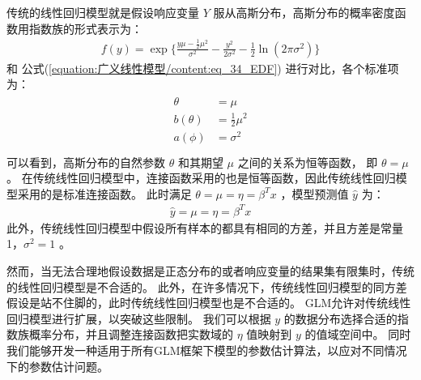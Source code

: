 \documentclass[letterpaper,10pt,english]{sphinxmanual}
\begin{document}
传统的线性回归模型就是假设响应变量 \(Y\) 服从高斯分布，高斯分布的概率密度函数用指数族的形式表示为：
\begin{equation}\label{equation:广义线性模型/content:广义线性模型/content:17}
\begin{split}f(y) = \exp \{ \frac{y\mu-\frac{1}{2}\mu^2}{\sigma^2} - \frac{y^2}{2\sigma^2}
- \frac{1}{2} \ln (2\pi\sigma^2) \}\end{split}
\end{equation}
和 公式(\ref{equation:广义线性模型/content:eq_34_EDF}) 进行对比，各个标准项为：
\begin{align}\label{equation:广义线性模型/content:广义线性模型/content:18}\!\begin{aligned}
\theta &=\mu\\
b(\theta) &= \frac{1}{2}\mu^2\\
a(\phi) &= \sigma^2\\
\end{aligned}\end{align}
可以看到，高斯分布的自然参数 \(\theta\) 和其期望 \(\mu\) 之间的关系为恒等函数，
即 \(\theta=\mu\) 。
在传统线性回归模型中，连接函数采用的也是恒等函数，因此传统线性回归模型采用的是标准连接函数。
此时满足 \(\theta=\mu=\eta=\beta^Tx\)
，模型预测值 \(\hat{y}\) 为：
\begin{equation}\label{equation:广义线性模型/content:广义线性模型/content:19}
\begin{split}\hat{y} = \mu = \eta =\beta^Tx\end{split}
\end{equation}
此外，传统线性回归模型中假设所有样本的都具有相同的方差，并且方差是常量1，\(\sigma^2=1\)
。

然而，当无法合理地假设数据是正态分布的或者响应变量的结果集有限集时，传统的线性回归模型是不合适的。
此外，在许多情况下，传统线性回归模型的同方差假设是站不住脚的，此时传统线性回归模型也是不合适的。
GLM允许对传统线性回归模型进行扩展，以突破这些限制。
我们可以根据 \(y\) 的数据分布选择合适的指数族概率分布，并且调整连接函数把实数域的 \(\eta\) 值映射到
\(y\) 的值域空间中。
同时我们能够开发一种适用于所有GLM框架下模型的参数估计算法，以应对不同情况下的参数估计问题。
\end{document}

